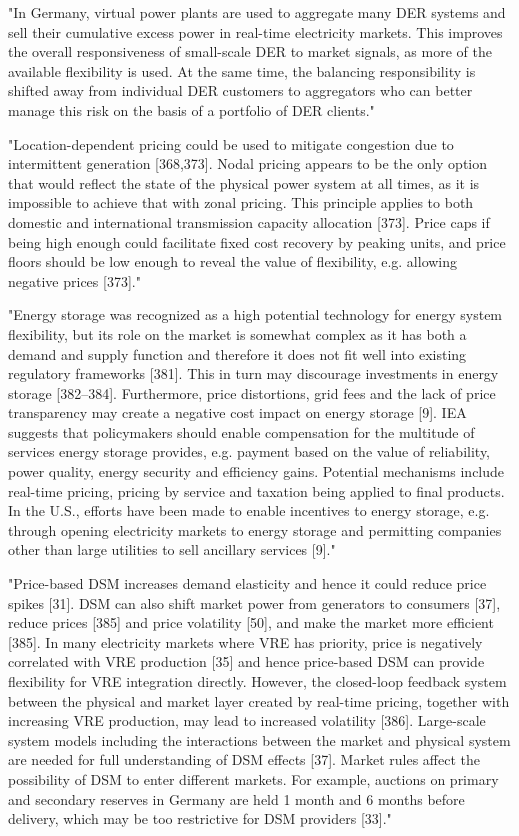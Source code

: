 "In Germany, virtual power plants are used to aggregate many DER systems and sell their cumulative excess power in real-time electricity markets. This improves the overall responsiveness of small-scale DER to market signals, as more of the available flexibility is used. At the same time, the balancing responsibility is shifted away from individual DER customers to aggregators who can better manage this risk on the basis of a portfolio of DER clients." \cite{international_energy_agency_status_2017}

"Location-dependent pricing could be used to mitigate congestion due to intermittent generation [368,373]. Nodal pricing appears to be the only option that would reflect the state of the physical power system at all times, as it is impossible to achieve that with zonal pricing. This principle applies to both domestic and international transmission capacity allocation [373]. Price caps if being high enough could facilitate fixed cost recovery by peaking units, and price floors should be low enough to reveal the value of flexibility, e.g. allowing negative prices [373]." \cite{lund_review_2015} 

"Energy storage was recognized as a high potential technology for energy system flexibility, but its role on the market is somewhat complex as it has both a demand and supply function and therefore it does not fit well into existing regulatory frameworks [381]. This in turn may discourage investments in energy storage [382–384]. Furthermore, price distortions, grid fees and the lack of price transparency may create a negative cost impact on energy storage [9]. IEA suggests that policymakers should enable compensation for the multitude of services energy storage provides, e.g. payment based on the value of reliability, power quality, energy security and efficiency gains. Potential mechanisms include real-time pricing, pricing by service and taxation being applied to final products. In the U.S., efforts have been made to enable incentives to energy storage, e.g. through opening electricity markets to energy storage and permitting companies other than large utilities to sell ancillary services [9]." \cite{lund_review_2015}

"Price-based DSM increases demand elasticity and hence it could reduce price spikes [31]. DSM can also shift market power from generators to consumers [37], reduce prices [385] and price volatility [50], and make the market more efficient [385]. In many electricity markets where VRE has priority, price is negatively correlated with VRE production [35] and hence price-based DSM can provide flexibility for VRE integration directly. However, the closed-loop feedback system between the physical and market layer created by real-time pricing, together with increasing VRE production, may lead to increased volatility [386]. Large-scale system models including the interactions between the market and physical system are needed for full understanding of DSM effects [37]. Market rules affect the possibility of DSM to enter different markets. For example, auctions on primary and secondary reserves in Germany are held 1 month and 6 months before delivery, which may be too restrictive for DSM providers [33]." \cite{lund_review_2015}


